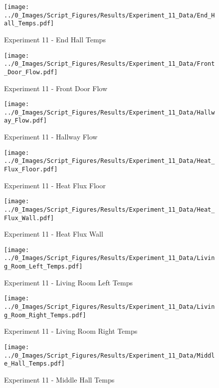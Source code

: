 	\begin{figure}[H]
		\centering
		\texttt{[image: ../0\_Images/Script\_Figures/Results/Experiment\_11\_Data/End\_Hall\_Temps.pdf]}
		\caption[]{Experiment 11 - End Hall Temps}
	\end{figure}
 
	\clearpage

	\begin{figure}[H]
		\centering
		\texttt{[image: ../0\_Images/Script\_Figures/Results/Experiment\_11\_Data/Front\_Door\_Flow.pdf]}
		\caption[]{Experiment 11 - Front Door Flow}
	\end{figure}
 

	\begin{figure}[H]
		\centering
		\texttt{[image: ../0\_Images/Script\_Figures/Results/Experiment\_11\_Data/Hallway\_Flow.pdf]}
		\caption[]{Experiment 11 - Hallway Flow}
	\end{figure}
 
	\clearpage

	\begin{figure}[H]
		\centering
		\texttt{[image: ../0\_Images/Script\_Figures/Results/Experiment\_11\_Data/Heat\_Flux\_Floor.pdf]}
		\caption[]{Experiment 11 - Heat Flux Floor}
	\end{figure}
 

	\begin{figure}[H]
		\centering
		\texttt{[image: ../0\_Images/Script\_Figures/Results/Experiment\_11\_Data/Heat\_Flux\_Wall.pdf]}
		\caption[]{Experiment 11 - Heat Flux Wall}
	\end{figure}
 
	\clearpage

	\begin{figure}[H]
		\centering
		\texttt{[image: ../0\_Images/Script\_Figures/Results/Experiment\_11\_Data/Living\_Room\_Left\_Temps.pdf]}
		\caption[]{Experiment 11 - Living Room Left Temps}
	\end{figure}
 

	\begin{figure}[H]
		\centering
		\texttt{[image: ../0\_Images/Script\_Figures/Results/Experiment\_11\_Data/Living\_Room\_Right\_Temps.pdf]}
		\caption[]{Experiment 11 - Living Room Right Temps}
	\end{figure}
 
	\clearpage

	\begin{figure}[H]
		\centering
		\texttt{[image: ../0\_Images/Script\_Figures/Results/Experiment\_11\_Data/Middle\_Hall\_Temps.pdf]}
		\caption[]{Experiment 11 - Middle Hall Temps}
	\end{figure}
 

